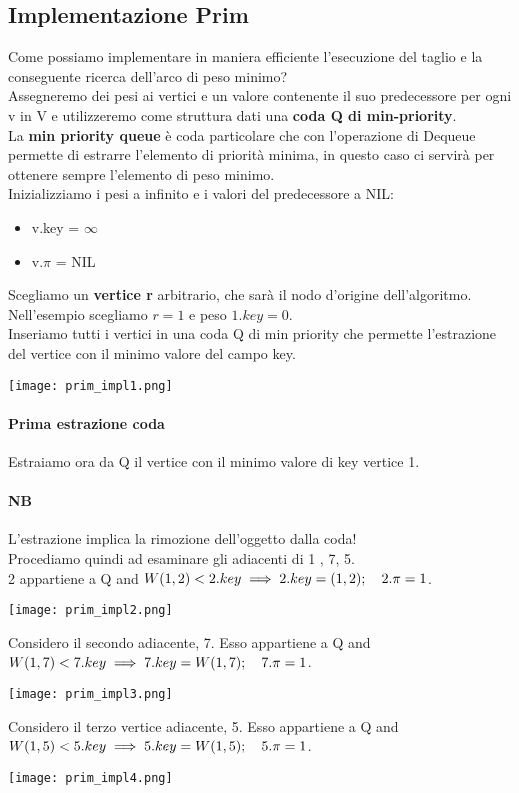\subsection{Implementazione Prim}
Come possiamo implementare in maniera efficiente l'esecuzione del taglio e la
conseguente ricerca dell'arco di peso minimo?\\
Assegneremo dei pesi ai vertici e un valore contenente il suo predecessore per ogni v in V e utilizzeremo
come struttura dati una \textbf{coda Q di min-priority}.\\
La \textbf{min priority queue} è coda particolare che con l'operazione di Dequeue permette
di estrarre l'elemento di priorità minima, in questo caso ci servirà per ottenere sempre l'elemento
di peso minimo.\\
Inizializziamo i pesi a infinito e i valori del predecessore a NIL:
\begin{itemize}
    \item v.key = $\infty$
    \item v.$\pi$ = NIL
\end{itemize}
Scegliamo un \textbf{vertice r} arbitrario, che sarà il nodo d'origine dell'algoritmo. 
Nell'esempio scegliamo $r = 1$ e peso $1.key = 0$.\\
Inseriamo tutti i vertici in una coda Q di min priority che permette l'estrazione 
del vertice con il minimo valore del campo key.
\begin{center}
    \texttt{[image: prim\_impl1.png]}
\end{center}
\paragraph*{Prima estrazione coda} Estraiamo ora da Q il vertice con il minimo valore di key \ra vertice 1.
\paragraph*{NB} L'estrazione implica la rimozione dell'oggetto dalla coda!\\
Procediamo quindi ad esaminare gli adiacenti di 1 , 7, 5.\\
2 appartiene a Q and $W(1,2) < 2.key \\ \implies 2.key = (1,2);\quad 2.\pi = 1$.
\begin{center}
    \texttt{[image: prim\_impl2.png]}
\end{center}
Considero il secondo adiacente, 7. Esso appartiene a Q and $W(1,7) < 7.key \\
\implies 7.key = W(1,7);\quad 7.\pi = 1$.
\begin{center}
    \texttt{[image: prim\_impl3.png]}
\end{center}
Considero il terzo vertice adiacente, 5. Esso appartiene a Q and $W(1,5) < 5.key \\
\implies 5.key = W(1,5); \quad 5.\pi = 1$.
\begin{center}
    \texttt{[image: prim\_impl4.png]}
\end{center}
